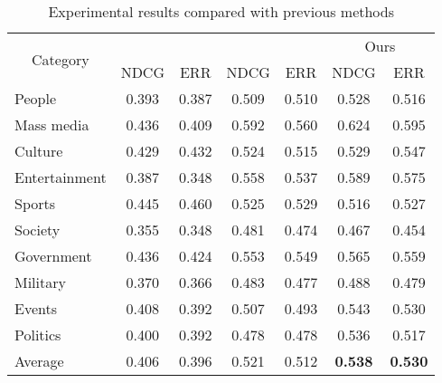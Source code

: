 \begin{table*}[]
\begin{tabular}{|l|cc|cc|cc|}
\hline
\multicolumn{1}{|c|}{\multirow{2}{*}{Category}} & \multicolumn{2}{|c|}{\citet{dimitrov2017makes}} & \multicolumn{2}{|c|}{\citet{thruesen2016link}} & \multicolumn{2}{|c|}{Ours} \\
\multicolumn{1}{|l|}{} & \multicolumn{1}{|c}{NDCG} & \multicolumn{1}{c|}{ERR} & \multicolumn{1}{|c}{NDCG} & \multicolumn{1}{c|}{ERR} & \multicolumn{1}{|c}{NDCG} & \multicolumn{1}{c|}{ERR} \\
\hline 
People & 0.393 & 0.387 & 0.509 & 0.510 & 0.528 & 0.516 \\

Mass media & 0.436 & 0.409 & 0.592 & 0.560 & 0.624 & 0.595 \\

Culture & 0.429 & 0.432 & 0.524 & 0.515 & 0.529 & 0.547 \\

Entertainment & 0.387 & 0.348 & 0.558 & 0.537 & 0.589 & 0.575 \\

Sports & 0.445 & 0.460 & 0.525 & 0.529 & 0.516 & 0.527 \\

Society & 0.355 & 0.348 & 0.481 & 0.474 & 0.467 & 0.454 \\

Government & 0.436 & 0.424 & 0.553 & 0.549 & 0.565 & 0.559 \\

Military & 0.370 & 0.366 & 0.483 & 0.477 & 0.488 & 0.479 \\

Events & 0.408 & 0.392 & 0.507 & 0.493 & 0.543 & 0.530 \\

Politics & 0.400 & 0.392 & 0.478 & 0.478 & 0.536 & 0.517 \\
\hline
Average & 0.406 & 0.396 & 0.521 & 0.512 & \textbf{0.538} & \textbf{0.530} \\
\hline       
\end{tabular}
\caption{Experimental results compared with previous methods}
\label{table_cmp1}
\end{table*}

